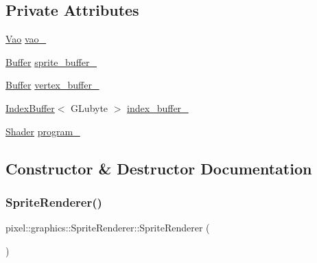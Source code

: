 \subsection*{Private Attributes}
\begin{DoxyCompactItemize}
\item 
\hyperlink{classpixel_1_1graphics_1_1_vao}{Vao} \hyperlink{classpixel_1_1graphics_1_1_sprite_renderer_a064ef85baafc556ada2c6235ecdfe330}{vao\+\_\+}
\item 
\hyperlink{classpixel_1_1graphics_1_1_buffer}{Buffer} \hyperlink{classpixel_1_1graphics_1_1_sprite_renderer_ae95525be12064b77563dc04ee50facbb}{sprite\+\_\+buffer\+\_\+}
\item 
\hyperlink{classpixel_1_1graphics_1_1_buffer}{Buffer} \hyperlink{classpixel_1_1graphics_1_1_sprite_renderer_a2c3ecd9a7f11c9ae542fb91e386284b5}{vertex\+\_\+buffer\+\_\+}
\item 
\hyperlink{classpixel_1_1graphics_1_1_index_buffer}{Index\+Buffer}$<$ G\+Lubyte $>$ \hyperlink{classpixel_1_1graphics_1_1_sprite_renderer_a28987cae2ef262de906e59ccf51c7276}{index\+\_\+buffer\+\_\+}
\item 
\hyperlink{classpixel_1_1graphics_1_1_shader}{Shader} \hyperlink{classpixel_1_1graphics_1_1_sprite_renderer_af7aafa12eb45ff1cc51b39565398bcca}{program\+\_\+}
\end{DoxyCompactItemize}


\subsection{Constructor \& Destructor Documentation}
\mbox{\label{classpixel_1_1graphics_1_1_sprite_renderer_ab219129e7daaed12d3a1d0d5a9618402}} 
\subsubsection{\texorpdfstring{Sprite\+Renderer()}{SpriteRenderer()}}
{\footnotesize\ttfamily pixel\+::graphics\+::\+Sprite\+Renderer\+::\+Sprite\+Renderer (\begin{DoxyParamCaption}{ }\end{DoxyParamCaption})}



